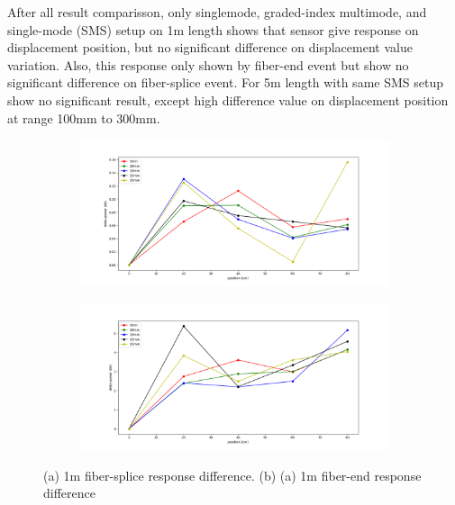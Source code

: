 \documentclass[a4paper,14pt]{article}
\begin{document}
After all result comparisson, only singlemode, graded-index multimode, and single-mode (SMS) setup on 1m length shows that sensor give response on displacement position, but no significant difference on displacement value variation.
Also, this response only shown by fiber-end event but show no significant difference on fiber-splice event.
For 5m length with same SMS setup show no significant result, except high difference value on displacement position at range 100mm to 300mm.
 

\begin{figure}[h!]
	\centering
	\captionsetup{justification=centering}
	\begin{subfigure}[b]{0.4\textwidth}
		\includegraphics[width=\textwidth]{images/splice_1}
		\caption{}
	\end{subfigure}
	\begin{subfigure}[b]{0.4\textwidth}
		\includegraphics[width=\textwidth]{images/end_1}
		\caption{}
	\end{subfigure}
	\caption[Setup Diagram]{\small{(a) 1m fiber-splice response difference. (b) (a) 1m fiber-end response difference}}
\end{figure}

\newpage
\end{document}
